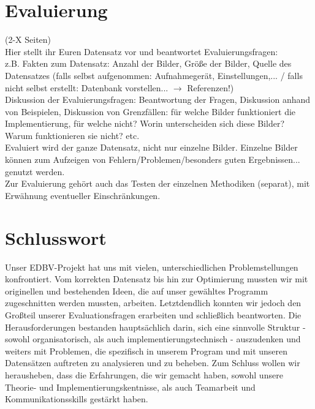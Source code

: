 \documentclass[paper=A4, deutsch]{scrartcl}
\begin{document}
\section{Evaluierung}
(2-X Seiten)\\
Hier stellt ihr Euren Datensatz vor und beantwortet Evaluierungsfragen:\\
z.B. Fakten zum Datensatz: Anzahl der Bilder, Größe der Bilder, Quelle des Datensatzes (falls selbst aufgenommen: Aufnahmegerät, Einstellungen,... / falls nicht selbst erstellt: Datenbank vorstellen... $\to$ Referenzen!)\\
Diskussion der Evaluierungsfragen: Beantwortung der Fragen, Diskussion anhand von Beispielen, Diskussion von Grenzfällen: für welche Bilder funktioniert die Implementierung, für welche nicht? Worin unterscheiden sich diese Bilder? Warum funktionieren sie nicht? etc.\\
Evaluiert wird der ganze Datensatz, nicht nur einzelne Bilder. Einzelne Bilder können zum Aufzeigen von Fehlern/Problemen/besonders guten Ergebnissen... genutzt werden.\\
Zur Evaluierung gehört auch das Testen der einzelnen Methodiken (separat), mit Erwähnung eventueller Einschränkungen.

\section{Schlusswort}
Unser EDBV-Projekt hat uns mit vielen, unterschiedlichen Problemstellungen konfrontiert. Vom korrekten Datensatz bis hin zur Optimierung mussten wir mit originellen und bestehenden Ideen, die auf unser gewähltes Programm zugeschnitten werden mussten, arbeiten. Letztdendlich konnten wir jedoch den Großteil unserer Evaluationsfragen erarbeiten und schließlich beantworten. Die Herausforderungen bestanden hauptsächlich darin, sich eine sinnvolle Struktur - sowohl organisatorisch, als auch implementierungstechnisch - auszudenken und weiters mit Problemen, die spezifisch in unserem Program und mit unseren Datensätzen auftreten zu analysieren und zu beheben. Zum Schluss wollen wir herausheben, dass die Erfahrungen, die wir gemacht haben, sowohl unsere Theorie- und Implementierungskentnisse, als auch Teamarbeit und Kommunikationsskills gestärkt haben.



\end{document}

